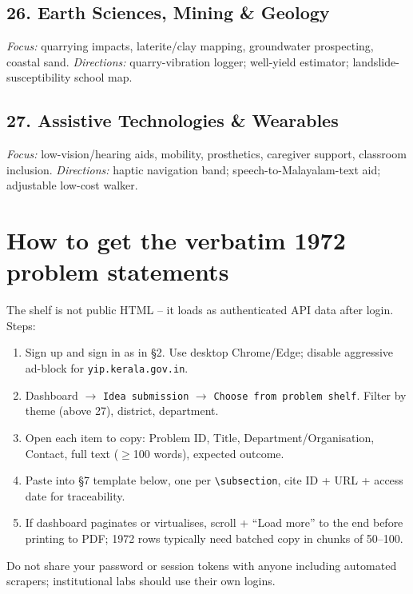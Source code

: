 \documentclass[11pt,a4paper]{article}
\begin{document}
\subsection{26. Earth Sciences, Mining \& Geology}
\textit{Focus:} quarrying impacts, laterite/clay mapping, groundwater prospecting, coastal sand. \textit{Directions:} quarry-vibration logger; well-yield estimator; landslide-susceptibility school map.

\subsection{27. Assistive Technologies \& Wearables}
\textit{Focus:} low-vision/hearing aids, mobility, prosthetics, caregiver support, classroom inclusion. \textit{Directions:} haptic navigation band; speech-to-Malayalam-text aid; adjustable low-cost walker.

\section{How to get the verbatim 1972 problem statements}
The shelf is not public HTML -- it loads as authenticated API data after login. Steps:
\begin{enumerate}[leftmargin=1.4em]
\item Sign up and sign in as in \S2. Use desktop Chrome/Edge; disable aggressive ad-block for \texttt{yip.kerala.gov.in}.
\item Dashboard $\rightarrow$ \texttt{Idea submission} $\rightarrow$ \texttt{Choose from problem shelf}. Filter by theme (above 27), district, department.
\item Open each item to copy: Problem ID, Title, Department/Organisation, Contact, full text ($\geq$100 words), expected outcome.
\item Paste into \S7 template below, one per \texttt{\textbackslash subsection}, cite ID + URL + access date for traceability.
\item If dashboard paginates or virtualises, scroll + ``Load more'' to the end before printing to PDF; 1972 rows typically need batched copy in chunks of 50--100.
\end{enumerate}
Do not share your password or session tokens with anyone including automated scrapers; institutional labs should use their own logins.
\end{document}
